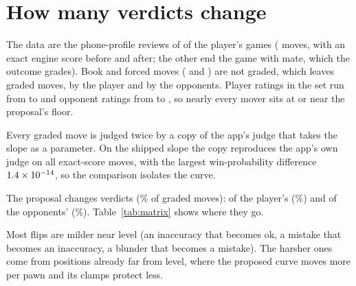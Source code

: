 \documentclass[11pt]{article}
\begin{document}
\section{How many verdicts change}

The data are the phone-profile reviews of \Games{} of the player's games
(\Records{} moves, \ExactPlies{} with an exact engine score before and after; the other
\NotExactPlies{} end the game with mate, which the outcome grades). Book and forced moves
(\BookPlies{} and \ForcedPlies) are not graded, which leaves \GradedPlies{} graded moves,
\GradedPlayer{} by the player and \GradedOpponent{} by the opponents. Player ratings in the
set run from \PlayerRatingMin{} to \PlayerRatingMax{} and opponent ratings from
\OpponentRatingMin{} to \OpponentRatingMax, so nearly every mover sits at or near the
proposal's floor.

Every graded move is judged twice by a copy of the app's judge that takes the slope as a
parameter. On the shipped slope the copy reproduces the app's own judge on all
\ExactPlies{} exact-score moves, with the largest win-probability difference
$1.4\times 10^{-14}$, so the comparison isolates the curve.

The proposal changes \Flips{} verdicts (\FlipShare\% of graded moves): \FlipsPlayer{} of the
player's (\FlipSharePlayer\%) and \FlipsOpponent{} of the opponents' (\FlipShareOpponent\%).
Table~\ref{tab:matrix} shows where they go.

\begin{table}[!htbp]
\centering\small
\begin{subtable}{\textwidth}\centering
\MatrixPlayer
\caption{The player's moves.}
\end{subtable}

\vspace{0.8em}
\begin{subtable}{\textwidth}\centering
\MatrixOpponent
\caption{The opponents' moves.}
\end{subtable}
\caption{Verdicts on the shipped curve (rows) and on the proposed one (columns). Unchanged
verdicts are in parentheses; flips are in bold.}
\label{tab:matrix}
\end{table}

Most flips are milder near level (an inaccuracy that becomes ok, a mistake that becomes an
inaccuracy, a blunder that becomes a mistake). The harsher ones come from positions already
far from level, where the proposed curve moves more per pawn and its clamps protect less.
\end{document}
